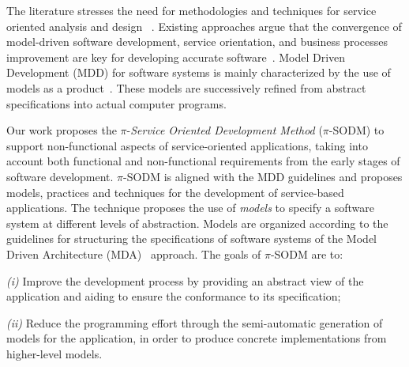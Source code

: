 




The literature stresses the need for methodologies and techniques for service oriented analysis and design 
~\cite{5}. 
Existing approaches argue that the convergence of model-driven software development, service orientation,   and  business processes improvement are key for developing accurate  software~\cite{watson}. 
Model Driven Development (MDD)  for software systems is mainly characterized by the use of models as a product~\cite{Selic03}.
These models are successively refined from abstract specifications into actual computer programs.

Our work proposes  the $\pi$-\textit{Service Oriented Development Method} ($\pi$-SODM)
to support non-functional aspects of service-oriented applications, taking into account both functional and non-functional requirements from the early stages of software development.
$\pi$-SODM is aligned with the MDD guidelines and proposes models, practices and techniques for the development of service-based applications.  The technique proposes  the use of \textit{models} to specify a software system at different levels of abstraction. 
Models are organized according to the guidelines for structuring the specifications of software systems of the Model Driven Architecture (MDA)~\cite{miller} approach. 
The goals of  $\pi$-SODM are to:
\begin{trivlist}
\item \textit{(i)} Improve the development process by providing an abstract view of the application and aiding to ensure the conformance to its specification;
\item \textit{(ii)} Reduce the programming effort through the semi-automatic generation of  models for the application, in order to produce concrete implementations from higher-level models.
\end{trivlist}

